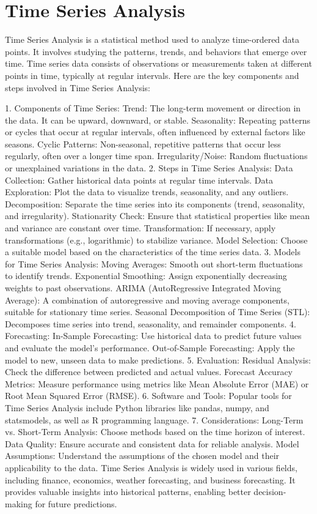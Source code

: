 % 
\section{Time Series Analysis}
\label{relatedknowledge:Time Series Analysis}
% 
Time Series Analysis is a statistical method used to analyze time-ordered data points. It involves studying the patterns, trends, and behaviors that emerge over time. Time series data consists of observations or measurements taken at different points in time, typically at regular intervals.
Here are the key components and steps involved in Time Series Analysis:

1. Components of Time Series:
Trend: The long-term movement or direction in the data. It can be upward, downward, or stable.
Seasonality: Repeating patterns or cycles that occur at regular intervals, often influenced by external factors like seasons.
Cyclic Patterns: Non-seasonal, repetitive patterns that occur less regularly, often over a longer time span.
Irregularity/Noise: Random fluctuations or unexplained variations in the data.
2. Steps in Time Series Analysis:
Data Collection: Gather historical data points at regular time intervals.
Data Exploration: Plot the data to visualize trends, seasonality, and any outliers.
Decomposition: Separate the time series into its components (trend, seasonality, and irregularity).
Stationarity Check: Ensure that statistical properties like mean and variance are constant over time.
Transformation: If necessary, apply transformations (e.g., logarithmic) to stabilize variance.
Model Selection: Choose a suitable model based on the characteristics of the time series data.
3. Models for Time Series Analysis:
Moving Averages: Smooth out short-term fluctuations to identify trends.
Exponential Smoothing: Assign exponentially decreasing weights to past observations.
ARIMA (AutoRegressive Integrated Moving Average): A combination of autoregressive and moving average components, suitable for stationary time series.
Seasonal Decomposition of Time Series (STL): Decomposes time series into trend, seasonality, and remainder components.
4. Forecasting:
In-Sample Forecasting: Use historical data to predict future values and evaluate the model's performance.
Out-of-Sample Forecasting: Apply the model to new, unseen data to make predictions.
5. Evaluation:
Residual Analysis: Check the difference between predicted and actual values.
Forecast Accuracy Metrics: Measure performance using metrics like Mean Absolute Error (MAE) or Root Mean Squared Error (RMSE).
6. Software and Tools:
Popular tools for Time Series Analysis include Python libraries like pandas, numpy, and statsmodels, as well as R programming language.
7. Considerations:
Long-Term vs. Short-Term Analysis: Choose methods based on the time horizon of interest.
Data Quality: Ensure accurate and consistent data for reliable analysis.
Model Assumptions: Understand the assumptions of the chosen model and their applicability to the data.
Time Series Analysis is widely used in various fields, including finance, economics, weather forecasting, and business forecasting. It provides valuable insights into historical patterns, enabling better decision-making for future predictions.

